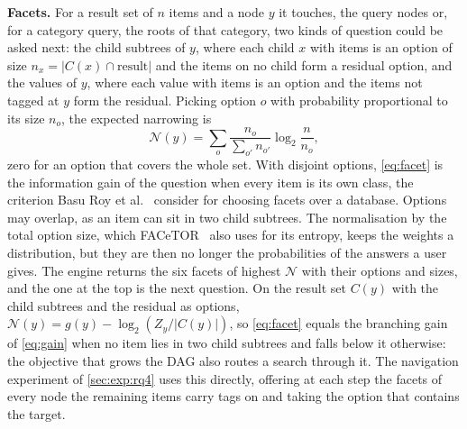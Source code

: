 \textbf{Facets.} For a result set of $n$ items and a node $y$ it touches, the
query nodes or, for a category query, the roots of that category, two kinds
of question could be asked next: the child subtrees of $y$, where each child $x$ with items is an option of size $n_x = |C(x) \cap \text{result}|$ and the
items on no child form a residual option, and the values of $y$, where each
value with items is an option and the items not tagged at $y$ form the
residual. Picking option $o$ with probability proportional to its size $n_o$,
the expected narrowing is
\begin{equation}
  \label{eq:facet}
  \mathcal{N}(y) = \sum_{o} \frac{n_o}{\sum_{o'} n_{o'}} \log_2 \frac{n}{n_o},
\end{equation}
zero for an option that covers the whole set. With disjoint options,
\cref{eq:facet} is the information gain of the question when every item is
its own class, the criterion Basu Roy et al.~\cite{roy2008minimum} consider
for choosing facets over a database. Options may overlap, as an item can sit
in two child subtrees. The normalisation by the total option size, which
FACeTOR~\cite{kashyap2010facetor} also uses for its entropy, keeps the
weights a distribution, but they are then no longer the probabilities of the
answers a user gives. The engine returns the six facets of highest
$\mathcal{N}$ with their options and sizes, and the one at the top is the
next question. On the result set $C(y)$ with the child subtrees and the
residual as options, $\mathcal{N}(y) = g(y) - \log_2 (Z_y / |C(y)|)$, so
\cref{eq:facet} equals the branching gain of \cref{eq:gain} when no item lies
in two child subtrees and falls below it otherwise: the objective that grows
the DAG also routes a search through it. The navigation experiment of
\cref{sec:exp:rq4} uses this directly, offering at each step the facets of
every node the remaining items carry tags on and taking the option that
contains the target.
